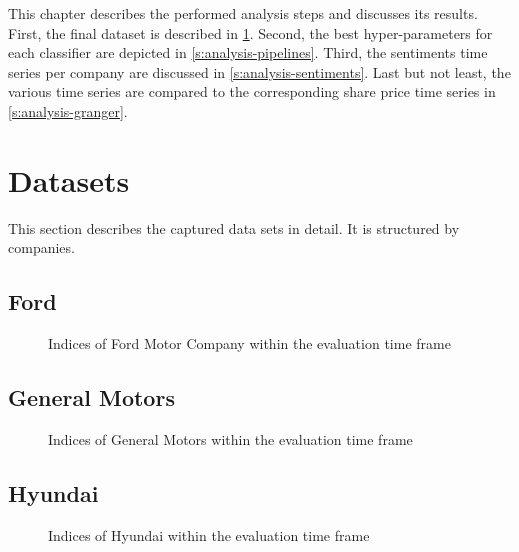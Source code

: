 
This chapter describes the performed analysis steps and discusses its results.
First, the final dataset is described in \cref{s:analysis-datasets}.
Second, the best hyper-parameters for each classifier are depicted in \cref{s:analysis-pipelines}.
Third, the sentiments time series per company are discussed in \cref{s:analysis-sentiments}.
Last but not least, the various time series are compared to the corresponding share price time series in \cref{s:analysis-granger}.

\section{Datasets}
\label{s:analysis-datasets}

This section describes the captured data sets in detail.
It is structured by companies.

\subsection{Ford}
\label{ss:analysis-datasets-ford}

\begin{figure}[hbt]
    \centering
    
    
    \caption{Indices of Ford Motor Company within the evaluation time frame}
    \label{fig:analysis-indices-ford}
\end{figure}    

\subsection{General Motors}
\label{ss:analysis-datasets-gm}

\begin{figure}[hbt]
    \centering
    
    
    \caption{Indices of General Motors within the evaluation time frame}
    \label{fig:analysis-indices-gm}
\end{figure}   

\subsection{Hyundai}
\label{ss:analysis-datasets-hyundai}

\begin{figure}[hbt]
    \centering
    
    
    \caption{Indices of Hyundai within the evaluation time frame}
    \label{fig:analysis-indices-hyundai}
\end{figure}   

